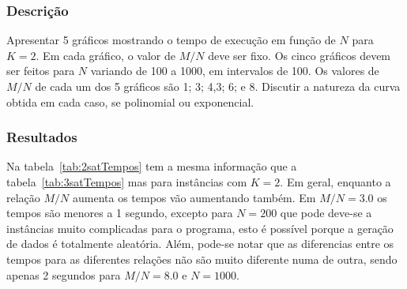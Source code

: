 	\subsubsection{Descrição}
		Apresentar 5 gráficos mostrando o tempo de execução em função de $N$ para $K = 2$. Em cada gráfico, o valor de $M / N$ deve ser fixo. Os cinco gráficos devem ser feitos para $N$ variando de 100 a 1000, em intervalos de 100. Os valores de $M / N$ de cada um dos 5 gráficos são 1; 3; 4,3; 6; e 8. Discutir a natureza da curva obtida em cada caso, se polinomial ou exponencial.
	
	\subsubsection{Resultados}
		Na tabela~\ref{tab:2satTempos} tem a mesma informação que a tabela~\ref{tab:3satTempos} mas para instâncias com $K=2$. Em geral, enquanto a relação $M/N$ aumenta os tempos vão aumentando também. Em $M/N=3.0$ os tempos são menores a 1 segundo, excepto para $N=200$ que pode deve-se a instâncias muito complicadas para o programa, esto é possível porque a geração de dados é totalmente aleatória. Além, pode-se notar que as diferencias entre os tempos para as diferentes relações não são muito diferente numa de outra, sendo apenas 2 segundos para $M/N=8.0$ e $N=1000$.
		\begin{table}[H]
			\caption{Comparação de tempos (segundos) de Max 2-SAT}
			\label{tab:2satTempos}
		\end{table}
		
